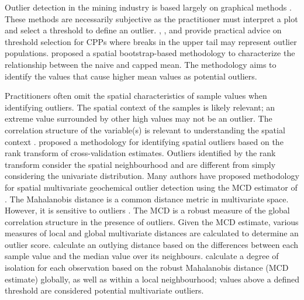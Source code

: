 Outlier detection in the mining industry is based largely on graphical methods \citep{leuangthong2015dealing, silva2021classification}. These methods are necessarily subjective as the practitioner must interpret a plot and select a threshold to define an outlier. \cite{leuangthong2015dealing}, \cite{nowak2013suggestions}, and \cite{rossi2013mineral} provide practical advice on threshold selection for \glspl{CPP} where breaks in the upper tail may represent outlier populations. \cite{babakhani2014geostatistical} proposed a spatial bootstrap-based methodology to characterize the relationship between the naive and capped mean. The methodology aims to identify the values that cause higher mean values as potential outliers.

Practitioners often omit the spatial characteristics of sample values when identifying outliers. The spatial context of the samples is likely relevant; an extreme value surrounded by other high values may not be an outlier. The correlation structure of the variable(s) is relevant to understanding the spatial context \citep{filzmoser2014identification}. \cite{babakhani2014geostatistical} proposed a methodology for identifying spatial outliers based on the rank transform of cross-validation estimates. Outliers identified by the rank transform consider the spatial neighbourhood and are different from simply considering the univariate distribution. Many authors \citep{filzmoser2020multivariate,filzmoser2014identification,ernst2017comparison, leung2021sample,harris2014multivariate,chen2008detecting} have proposed methodology for spatial multivariate geochemical outlier detection using the \gls{MCD} estimator of \cite{rousseeuw1999fast}. The Mahalanobis distance \citep{mahalanobis2018generalized} is a common distance metric in multivariate space. However, it is sensitive to outliers \citep{filzmoser2014identification}. The \gls{MCD} is a robust measure of the global correlation structure in the presence of outliers. Given the \gls{MCD} estimate, various measures of local and global multivariate distances are calculated to determine an outlier score. \cite{chen2008detecting} calculate an outlying distance based on the differences between each sample value and the median value over its neighbours. \cite{filzmoser2014identification} calculate a degree of isolation for each observation based on the robust Mahalanobis distance (\gls{MCD} estimate) globally, as well as within a local neighbourhood; values above a defined threshold are considered potential multivariate outliers.

